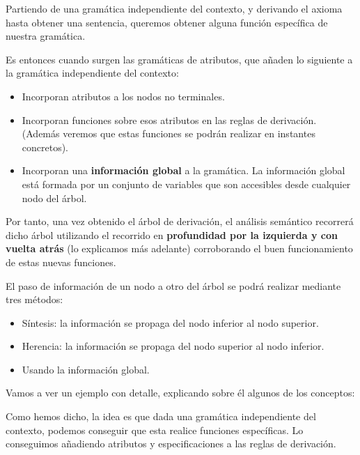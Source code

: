 \documentclass{apuntes}
\begin{document}
Partiendo de una gramática independiente del contexto, y derivando el axioma hasta obtener una sentencia, queremos obtener alguna función específica de nuestra gramática.

Es entonces cuando surgen las gramáticas de atributos, que añaden lo siguiente a la gramática independiente del contexto:
\begin{itemize}
\item Incorporan atributos a los nodos no terminales.

\item Incorporan funciones sobre esos atributos en las reglas de derivación. (Además veremos que estas funciones se podrán realizar en instantes concretos).

\item Incorporan una \textbf{información global} a la gramática. La información global está formada por un conjunto de variables que son accesibles desde cualquier nodo del árbol.
\end{itemize}
Por tanto, una vez obtenido el árbol de derivación, el análisis semántico recorrerá dicho árbol utilizando el recorrido en  \textbf{profundidad por la izquierda y con vuelta atrás} (lo explicamos más adelante) corroborando el buen funcionamiento de estas nuevas funciones.

El paso de información de un nodo a otro del árbol se podrá realizar mediante tres métodos:

\begin{itemize}
\item Síntesis: la información se propaga del nodo inferior al nodo superior.

\item Herencia: la información se propaga del nodo superior al nodo inferior.

\item Usando la información global.
\end{itemize}

Vamos a ver un ejemplo con detalle, explicando sobre él algunos de los conceptos:

Como hemos dicho, la idea es que dada una gramática independiente del contexto, podemos conseguir que esta realice funciones específicas. Lo conseguimos añadiendo atributos y especificaciones a las reglas de derivación.
\end{document}
